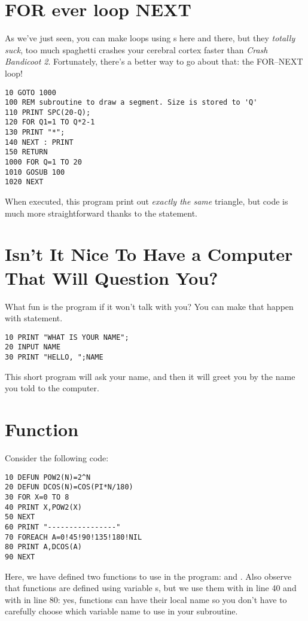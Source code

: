 \section[FOR--NEXT Loop]{FOR ever loop NEXT}

As we've just seen, you can make loops using s here and there, but they \emph{totally suck}, too much spaghetti crashes your cerebral cortex faster than \emph{Crash Bandicoot 2}. Fortunately, there's a better way to go about that: the FOR--NEXT loop!

\begin{lstlisting}
10 GOTO 1000
100 REM subroutine to draw a segment. Size is stored to 'Q'
110 PRINT SPC(20-Q);
120 FOR Q1=1 TO Q*2-1
130 PRINT "*";
140 NEXT : PRINT
150 RETURN
1000 FOR Q=1 TO 20
1010 GOSUB 100
1020 NEXT
\end{lstlisting}

When executed, this program print out \emph{exactly the same} triangle, but code is much more straightforward thanks to the  statement.

\section[Get User INPUT]{Isn't It Nice To Have a Computer That Will Question You?}

What fun is the program if it won't talk with you? You can make that happen with  statement.

\begin{lstlisting}
10 PRINT "WHAT IS YOUR NAME";
20 INPUT NAME
30 PRINT "HELLO, ";NAME
\end{lstlisting}

This short program will ask your name, and then it will greet you by the name you told to the computer.

\section[Function]{Function}

Consider the following code:

\begin{lstlisting}
10 DEFUN POW2(N)=2^N
20 DEFUN DCOS(N)=COS(PI*N/180)
30 FOR X=0 TO 8
40 PRINT X,POW2(X)
50 NEXT
60 PRINT "----------------"
70 FOREACH A=0!45!90!135!180!NIL
80 PRINT A,DCOS(A)
90 NEXT
\end{lstlisting}

Here, we have defined two functions to use in the program:  and . Also observe that functions are defined using variable s, but we use them with  in line 40 and with  in line 80: yes, functions can have their local name so you don't have to carefully choose which variable name to use in your subroutine.

